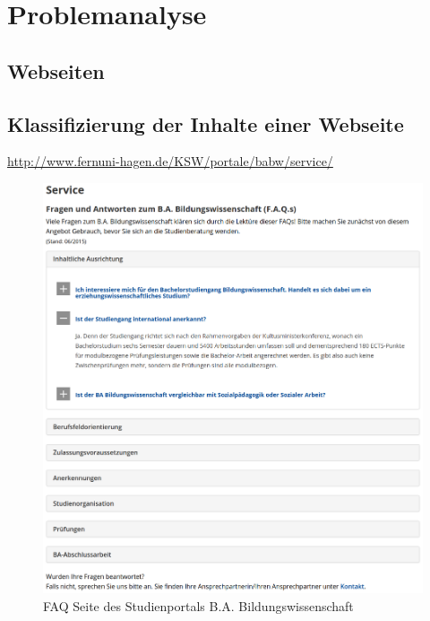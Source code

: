 \chapter{Problemanalyse}
    \label{chapter:ProblemAnalysis}
    \section{Webseiten}
    \section{\imperia}
    \section{\wordpress}
    \section{Klassifizierung der Inhalte einer Webseite}
        \url{http://www.fernuni-hagen.de/KSW/portale/babw/service/}

        \begin{figure}
            \centering
            \includegraphics[width=\textwidth]{../resources/babw_service_faq.png}
            \caption{FAQ Seite des Studienportals B.A. Bildungswissenschaft}
            \label{image:BuildingBlocks}
        \end{figure}